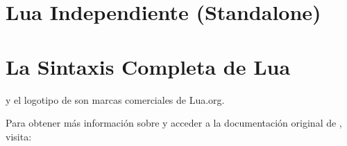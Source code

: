 \documentclass[12pt, openany]{book}
\begin{document}
\newpage  %

\thispagestyle{empty}
\textcolor{white}{} %
\newpage  %

\pagestyle{fancy}
\tableofcontents
\newpage  %

\thispagestyle{empty}
\textcolor{white}{} %
\newpage  %


\chapter{Lua Independiente (Standalone)}

\lipsum[1-3]


\chapter{La Sintaxis Completa de Lua}
\lipsum[1-3]


\newpage  %
 y el logotipo de  son marcas comerciales de Lua.org.

Para obtener más información sobre  y acceder a la documentación original de , visita: 
\end{document}
